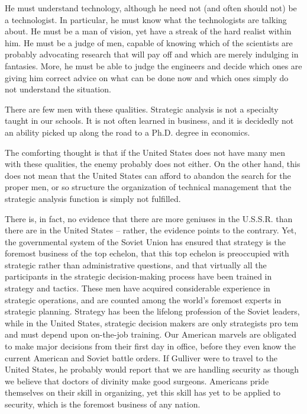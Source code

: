 He must understand technology, although he need not (and often should not) be a technologist. In particular, he must know what the technologists are talking about. He must be a man of vision, yet have a streak of the hard realist within him. He must be a judge of men, capable of knowing which of the scientists are probably advocating research that will pay off and which are merely indulging in fantasies. More, he must be able to judge the engineers and decide which ones are giving him correct advice on what can be done now and which ones simply do not understand the situation.

There are few men with these qualities. Strategic analysis is not a specialty taught in our schools. It is not often learned in business, and it is decidedly not an ability picked up along the road to a Ph.D. degree in economics.

The comforting thought is that if the United States does not have many men with these qualities, the enemy probably does not either. On the other hand, this does not mean that the United States can afford to abandon the search for the proper men, or so structure the organization of technical management that the strategic analysis function is simply not fulfilled.

There is, in fact, no evidence that there are more geniuses in the U.S.S.R. than there are in the United States -- rather, the evidence points to the contrary. Yet, the governmental system of the Soviet Union has ensured that strategy is the foremost business of the top echelon, that this top echelon is preoccupied with strategic rather than administrative questions, and that virtually all the participants in the strategic decision-making process have been trained in strategy and tactics. These men have acquired considerable experience in strategic operations, and are counted among the world's foremost experts in strategic planning. Strategy has been the lifelong profession of the Soviet leaders, while in the United States, strategic decision makers are only strategists pro tem and must depend upon on-the-job training. Our American marvels are obligated to make major decisions from their first day in office, before they even know the current American and Soviet battle orders. If Gulliver were to travel to the United States, he probably would report that we are handling security as though we believe that doctors of divinity make good surgeons. Americans pride themselves on their skill in organizing, yet this skill has yet to be applied to security, which is the foremost business of any nation.

